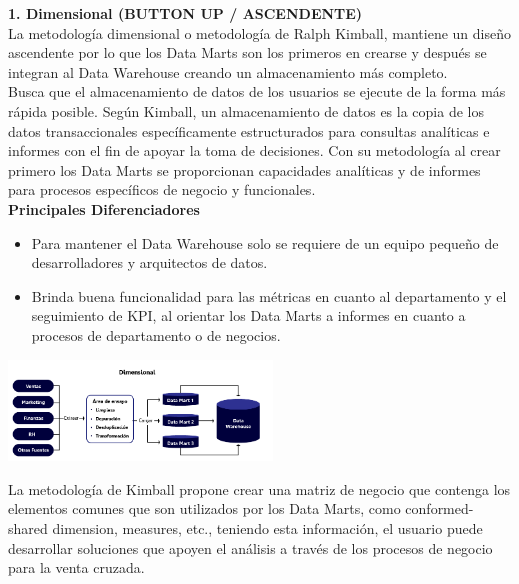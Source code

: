 \documentclass[twoside,twocolumn]{article}
\begin{document}
\noindent\textbf{\large 1. Dimensional (BUTTON UP / ASCENDENTE)}\\[0.1in]
La metodología dimensional o metodología de Ralph Kimball, mantiene un diseño ascendente por lo que los Data Marts son los primeros en crearse y después se integran al Data Warehouse creando un almacenamiento más completo.\\[0.1in]
Busca que el almacenamiento de datos de los usuarios se ejecute de la forma más rápida posible. Según Kimball, un almacenamiento de datos es la copia de los datos transaccionales específicamente estructurados para consultas analíticas e informes con el fin de apoyar la toma de decisiones. Con su metodología al crear primero los Data Marts se proporcionan capacidades analíticas y de informes para procesos específicos de negocio y funcionales.\\[0.1in]
\textbf{Principales Diferenciadores}
\begin{itemize}
    \item Para mantener el Data Warehouse solo se requiere de un equipo pequeño de desarrolladores y arquitectos de datos.
    \item Brinda buena funcionalidad para las métricas en cuanto al departamento y el seguimiento de KPI, al orientar los Data Marts a informes en cuanto a procesos de departamento o de negocios.
\end{itemize}
\begin{center}
    \includegraphics[width=7cm]{./img/img4.png}
\end{center}
La metodología de Kimball propone crear una matriz de negocio que contenga los elementos comunes que son utilizados por los Data Marts, como conformed-shared dimension, measures, etc., teniendo esta información, el usuario puede desarrollar soluciones que apoyen el análisis a través de los procesos de negocio para la venta cruzada.\\[0.1in]
\end{document}
